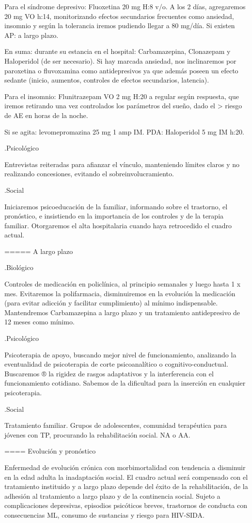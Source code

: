 Para el síndrome depresivo: Fluoxetina 20 mg H:8 v/o. A los 2 días, agregaremos 20 mg VO h:14, monitorizando efectos secundarios frecuentes como ansiedad, insomnio y según la tolerancia iremos pudiendo llegar a 80 mg/día. Si existen AP: a largo plazo.

En suma: durante su estancia en el hospital: Carbamazepina, Clonazepam y Haloperidol (de ser necesario). Si hay marcada ansiedad, nos inclinaremos por paroxetina o fluvoxamina como antidepresivos ya que además poseen un efecto sedante (inicio, aumentos, controles de efectos secundarios, latencia).

Para el insomnio: Flunitrazepam VO 2 mg H:20 a regular según respuesta, que iremos retirando una vez controlados los parámetros del sueño, dado el > riesgo de AE en horas de la noche.

Si se agita: levomepromazina 25 mg 1 amp IM. PDA: Haloperidol 5 mg IM h:20.

.Psicológico

Entrevistas reiteradas para afianzar el vínculo, manteniendo límites claros y no realizando concesiones, evitando el sobreinvolucramiento.

.Social

Iniciaremos psicoeducación de la familiar, informando sobre el trastorno, el pronóstico, e insistiendo en la importancia de los controles y de la terapia familiar. Otorgaremos el alta hospitalaria cuando haya retrocedido el cuadro actual.

===== A largo plazo

.Biológico

Controles de medicación en policlínica, al principio semanales y luego hasta 1 x mes. Evitaremos la polifarmacia, disminuiremos en la evolución la medicación (para evitar adicción y facilitar cumplimiento) al mínimo indispensable. Mantendremos Carbamazepina a largo plazo y un tratamiento antidepresivo de 12 meses como mínimo.

.Psicológico

Psicoterapia de apoyo, buscando mejor nivel de funcionamiento, analizando la eventualidad de psicoterapia de corte psicoanalítico o cognitivo-conductual. Buscaremos ® la rigidez de rasgos adaptativos y la interferencia con el funcionamiento cotidiano. Sabemos de la dificultad para la inserción en cualquier psicoterapia.

.Social

Tratamiento familiar. Grupos de adolescentes, comunidad terapéutica para jóvenes con TP, procurando la rehabilitación social. NA o AA.

==== Evolución y pronóstico

Enfermedad de evolución crónica con morbimortalidad con tendencia a disminuir en la edad adulta la inadaptación social. El cuadro actual será compensado con el tratamiento instituido y a largo plazo depende del éxito de la rehabilitación, de la adhesión al tratamiento a largo plazo y de la continencia social. Sujeto a complicaciones depresivas, episodios psicóticos breves, trastornos de conducta con consecuencias ML, consumo de sustancias y riesgo para HIV-SIDA.
